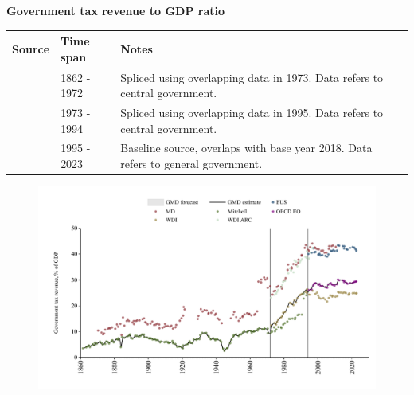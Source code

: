 \documentclass[12pt,a4paper,landscape]{article}
\begin{document}
\begin{adjustbox}{max totalsize={\paperwidth}{\paperheight},center}
\begin{minipage}[t][\textheight][t]{\textwidth}
\vspace*{0.5cm}
{}
\begin{center}
{\Large\bfseries Government tax revenue to GDP ratio}
\end{center}
\vspace{0.5cm}
\begin{table}[H]
\centering
\small
\begin{tabular}{|l|l|l|}
\hline
\textbf{Source} & \textbf{Time span} & \textbf{Notes} \\
\hline
\rowcolor{white}\cite{Mitchell}& 1862 - 1972 &Spliced using overlapping data in 1973. Data refers to central government.\\
\rowcolor{lightgray}\cite{WDI}& 1973 - 1994 &Spliced using overlapping data in 1995. Data refers to central government.\\
\rowcolor{white}\cite{OECD_EO}& 1995 - 2023 &Baseline source, overlaps with base year 2018. Data refers to general government.\\
\hline
\end{tabular}
\end{table}
\begin{figure}[H]
\centering
\includegraphics[width=\textwidth,height=0.6\textheight,keepaspectratio]{graphs/ITA_govtax_GDP.pdf}
\end{figure}
\end{minipage}
\end{adjustbox}
\end{document}
